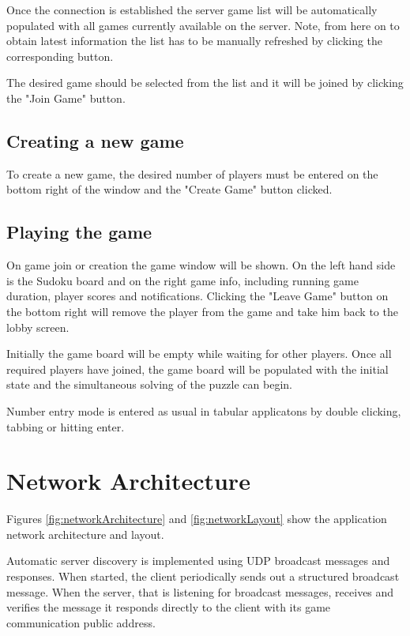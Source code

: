\documentclass[a4paper]{article}
\begin{document}
Once the connection is established the server game list will be automatically populated with all games currently available on the server. Note, from here on to obtain latest information the list has to be manually refreshed by clicking the corresponding button.

The desired game should be selected from the list and it will be joined by clicking the "Join Game" button.


\subsection{Creating a new game}

To create a new game, the desired number of players must be entered on the bottom right of the window and the "Create Game" button clicked.


\subsection{Playing the game}

On game join or creation the game window will be shown. On the left hand side is the Sudoku board and on the right game info, including running game duration, player scores and notifications. Clicking the "Leave Game" button on the bottom right will remove the player from the game and take him back to the lobby screen.

Initially the game board will be empty while waiting for other players. Once all required players have joined, the game board will be populated with the initial state and the simultaneous solving of the puzzle can begin.

Number entry mode is entered as usual in tabular applicatons by double clicking, tabbing or hitting enter.


\section{Network Architecture}

Figures \ref{fig:networkArchitecture} and \ref{fig:networkLayout} show the application network architecture and layout.

Automatic server discovery is implemented using UDP broadcast messages and responses. When started, the client periodically sends out a structured broadcast message. When the server, that is listening for broadcast messages, receives and verifies the message it responds directly to the client with its game communication public address.
\end{document}
